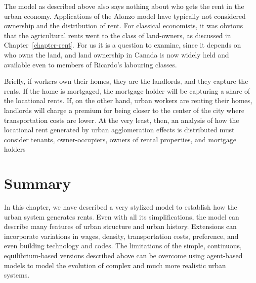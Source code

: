 The model as described above also says nothing about who gets the rent in the urban economy. Applications of the \Gls{Alonzo model} have typically not considered ownership and the distribution of rent. For classical economists, it was obvious that the agricultural rents went to the class of land-owners, as discussed in Chapter~\ref{chapter-rent}. 
For us it is a question to examine, since it depends on who owns the land, and land ownership in Canada is now widely held and available even to members of Ricardo's labouring classes.
 
Briefly, if workers own their homes, they are the landlords, and they capture the rents. If the home is mortgaged, the mortgage holder will be capturing a share of the locational rents. If, on the other hand, urban workers are renting their homes, landlords will charge a premium for being closer to the center of the city where transportation costs are lower. At the very least, then, an analysis of how  the locational rent generated by  urban agglomeration effects is distributed must consider tenants, owner-occupiers, owners of rental properties, and mortgage holders 



\section{Summary}

In this chapter, we have described a very stylized model to  establish how the urban system generates rents. Even with all its simplifications, the model can describe many features of urban structure and urban history.   %
Extensions can incorporate variations in wages, density, transportation costs, preference, and even building technology and codes. The limitations of the simple, continuous, equilibrium-based versions described above can be overcome using agent-based models to model the evolution of complex and much more realistic urban systems. 


